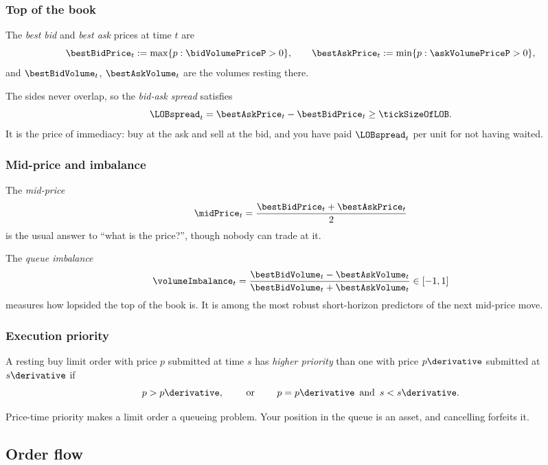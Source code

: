 \begin{frame}
  \frametitle{Top of the book}
\begin{defi}
\label{def.bestQuotes}
The \emph{best bid} and \emph{best ask} prices at time $t$ are
\[
\bestBidPrice_t := \max \lbrace p : \bidVolumePriceP > 0 \rbrace,
\qquad
\bestAskPrice_t := \min \lbrace p : \askVolumePriceP > 0 \rbrace,
\]
and $\bestBidVolume_t$, $\bestAskVolume_t$ are the volumes resting there.
\end{defi}

\pause

The sides never overlap, so the \emph{bid-ask spread} satisfies
\[
\LOBspread_t = \bestAskPrice_t - \bestBidPrice_t \geq \tickSizeOfLOB.
\]
It is the price of immediacy:
buy at the ask and sell at the bid, and you have paid $\LOBspread_t$ per unit
for not having waited.
\end{frame}

\begin{frame}
  \frametitle{Mid-price and imbalance}
The \emph{mid-price}
\[
\midPrice_t = \frac{\bestBidPrice_t + \bestAskPrice_t}{2}
\]
is the usual answer to ``what is the price?'',
though nobody can trade at it.

\pause

The \emph{queue imbalance}
\[
\volumeImbalance_t = \frac{\bestBidVolume_t - \bestAskVolume_t}{\bestBidVolume_t + \bestAskVolume_t} \in [-1,1]
\]
measures how lopsided the top of the book is.
It is among the most robust short-horizon predictors of the next mid-price move.
\end{frame}

\begin{frame}
  \frametitle{Execution priority}
\begin{defi}
\label{def.executionPriority}
A resting buy limit order with price $p$ submitted at time $s$
has \emph{higher priority} than one with price $p\derivative$ submitted at $s\derivative$ if
\[
p > p\derivative,
\qquad \text{ or } \qquad
p = p\derivative \, \text{ and } \, s < s\derivative.
\]
\end{defi}

\pause

Price-time priority makes a limit order a queueing problem.
Your position in the queue is an asset,
and cancelling forfeits it.
\end{frame}

\subsection{Order flow}

